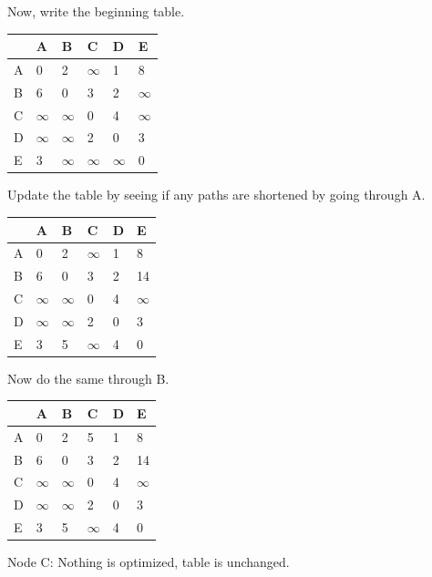 \documentclass{article}
\begin{document}
\begin{enumerate}
Now, write the beginning table. 
\begin{table}[H]
\begin{tabular}{|l|l|l|l|l|l|}
\hline
 & A & B & C & D & E \\ \hline
A & 0 & 2 & $\infty$ & 1 & 8 \\ \hline
B & 6 & 0 & 3 & 2 & $\infty$ \\ \hline
C & $\infty$ & $\infty$ & 0 & 4 & $\infty$ \\ \hline
D & $\infty$ & $\infty$ & 2 & 0 & 3 \\ \hline
E & 3 & $\infty$ & $\infty$ & $\infty$ & 0 \\ \hline
\end{tabular}
\end{table}

Update the table by seeing if any paths are shortened by going through A. 

\begin{table}[H]
\begin{tabular}{|l|l|l|l|l|l|}
\hline
 & A & B & C & D & E \\ \hline
A & 0 & 2 & $\infty$ & 1 & 8 \\ \hline
B & 6 & 0 & 3 & 2 & 14 \\ \hline
C & $\infty$ & $\infty$ & 0 & 4 & $\infty$ \\ \hline
D & $\infty$ & $\infty$ & 2 & 0 & 3 \\ \hline
E & 3 & 5 & $\infty$ & 4 & 0 \\ \hline
\end{tabular}
\end{table}

Now do the same through B. 
\begin{table}[H]
\begin{tabular}{|l|l|l|l|l|l|}
\hline
 & A & B & C & D & E \\ \hline
A & 0 & 2 & 5 & 1 & 8 \\ \hline
B & 6 & 0 & 3 & 2 & 14 \\ \hline
C & $\infty$ & $\infty$ & 0 & 4 & $\infty$ \\ \hline
D & $\infty$ & $\infty$ & 2 & 0 & 3 \\ \hline
E & 3 & 5 & $\infty$ & 4 & 0 \\ \hline
\end{tabular}
\end{table}

Node C: Nothing is optimized, table is unchanged. 


\end{enumerate}
\end{document}
